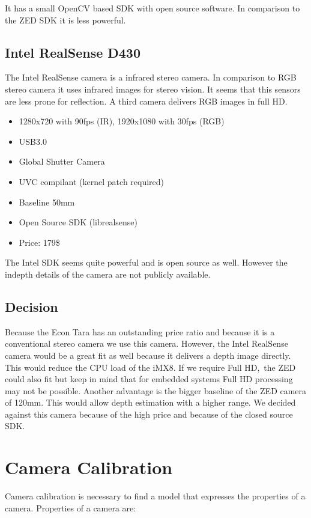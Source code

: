 \documentclass[11pt,a4paper,titlepage,oneside]{report}
\begin{document}
It has a small OpenCV based SDK with open source software. In comparison to the ZED SDK it is less powerful.

\section{Intel RealSense D430}
The Intel RealSense camera is a infrared stereo camera. In comparison to RGB stereo camera it uses infrared images for stereo vision. It seems that this sensors are less prone for reflection. A third camera delivers RGB images in full HD.
\begin{itemize}
	\item 1280x720 with 90fps (IR), 1920x1080 with 30fps (RGB)
	\item USB3.0
	\item Global Shutter Camera
	\item UVC compilant (kernel patch required)
	\item Baseline 50mm
	\item Open Source SDK (librealsense)
	\item Price: 179\$
\end{itemize}

The Intel SDK seems quite powerful and is open source as well. However the indepth details of the camera are not publicly available.

\section{Decision}

Because the Econ Tara has an outstanding price ratio and because it is a conventional stereo camera we use this camera. However, the Intel RealSense camera would be a great fit as well because it delivers a depth image directly. This would reduce the CPU load of the iMX8. If we require Full HD, the ZED could also fit but keep in mind that for embedded systems Full HD processing may not be possible. Another advantage is the bigger baseline of the ZED camera of 120mm. This would allow depth estimation with a higher range. We decided against this camera because of the high price and because of the closed source SDK.

\chapter{Camera Calibration}

Camera calibration is necessary to find a model that expresses the properties of a camera. Properties of a camera are:
\end{document}
